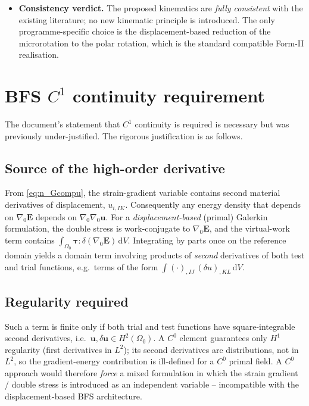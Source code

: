 \documentclass[11pt]{article}
\newcommand{\gradz}{\nabla_{0}}
\newcommand{\bu}{\mathbf{u}}
\newcommand{\bE}{\mathbf{E}}
\newcommand{\gradz}{\nabla_{0}}
\newcommand{\bu}{\mathbf{u}}
\newcommand{\bE}{\mathbf{E}}
\begin{document}
\begin{itemize}
\item \textbf{Consistency verdict.} The proposed kinematics are
\emph{fully consistent} with the existing literature; no new
kinematic principle is introduced. The only programme-specific choice
is the displacement-based reduction of the microrotation to the polar
rotation, which is the standard compatible Form-II realisation.
\end{itemize}

\section{BFS $C^{1}$ continuity requirement}
\label{sec:bfs}

The document's statement that $C^{1}$ continuity is required is
necessary but was previously under-justified. The rigorous
justification is as follows.

\subsection{Source of the high-order derivative}

From \eqref{eq:n_Gcompu}, the strain-gradient variable contains second
material derivatives of displacement, $u_{i,IK}$. Consequently any
energy density that depends on $\gradz\bE$ depends on
$\nabla_{0}\nabla_{0}\bu$. For a \emph{displacement-based} (primal)
Galerkin formulation, the double stress is work-conjugate to
$\gradz\bE$, and the virtual-work term contains
$\int_{\Omega_{0}}\boldsymbol{\tau}:\delta(\gradz\bE)\,\mathrm{d}V$.
Integrating by parts once on the reference domain yields a domain term
involving products of \emph{second} derivatives of both test and trial
functions, e.g.\ terms of the form $\int (\cdot)_{,IJ}\,(\delta
u)_{,KL}\,\mathrm{d}V$.

\subsection{Regularity required}

Such a term is finite only if both trial and test functions have
square-integrable second derivatives, i.e.\ $\bu,\delta\bu\in
H^{2}(\Omega_{0})$. A $C^{0}$ element guarantees only
$H^{1}$ regularity (first derivatives in $L^{2}$); its second
derivatives are distributions, not in $L^{2}$, so the gradient-energy
contribution is ill-defined for a $C^{0}$ primal field. A $C^{0}$
approach would therefore \emph{force} a mixed formulation in which the
strain gradient / double stress is introduced as an independent
variable -- incompatible with the displacement-based BFS architecture.
\end{document}
